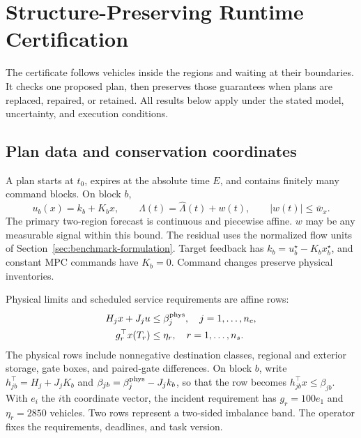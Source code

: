\documentclass[preprint,12pt]{elsarticle}
\begin{document}
\section{Structure-Preserving Runtime Certification}
\label{sec:new-certification}
\label{app:repair-cost}

The certificate follows vehicles inside the regions and waiting at their
boundaries. It checks one proposed plan, then preserves those guarantees
when plans are replaced, repaired, or retained. All results below apply
under the stated model, uncertainty, and execution conditions.

\subsection{Plan data and conservation coordinates}

A plan starts at $t_0$, expires at the absolute time $E$, and contains
finitely many command blocks. On block $b$,
\begin{equation}
 u_b(x)=k_b+K_bx,
 \qquad \Lambda(t)=\widehat\Lambda(t)+w(t),
 \qquad |w(t)|\le\bar w_x.
 \label{eq:new-plan-data}
\end{equation}
The primary two-region forecast is continuous and piecewise affine.
$w$ may be any measurable signal within this bound. The residual uses the
normalized flow units of Section~\ref{sec:benchmark-formulation}.
Target feedback has $k_b=u_b^\star-K_bx_b^\star$, and constant MPC commands
have $K_b=0$. Command changes preserve physical inventories.

Physical limits and scheduled service requirements are affine rows:
\begin{align}
 H_jx+J_ju&\le\beta_j^{\rm phys},\quad j=1,\ldots,n_c,
 \label{eq:new-physical-rows}\\
 g_r^\top x(T_r)&\le\eta_r,\quad r=1,\ldots,n_s.
 \label{eq:new-service-rows}
\end{align}
The physical rows include nonnegative destination classes, regional and
exterior storage, gate boxes, and paired-gate differences. On block $b$,
write $h_{jb}^\top=H_j+J_jK_b$ and
$\beta_{jb}=\beta_j^{\rm phys}-J_jk_b$, so that the row becomes
$h_{jb}^\top x\le\beta_{jb}$. With $e_i$ the $i$th coordinate vector,
the incident requirement has $g_r=100e_1$ and $\eta_r=2850$ vehicles.
Two rows represent a two-sided imbalance band. The operator fixes the
requirements, deadlines, and task version.
\end{document}

